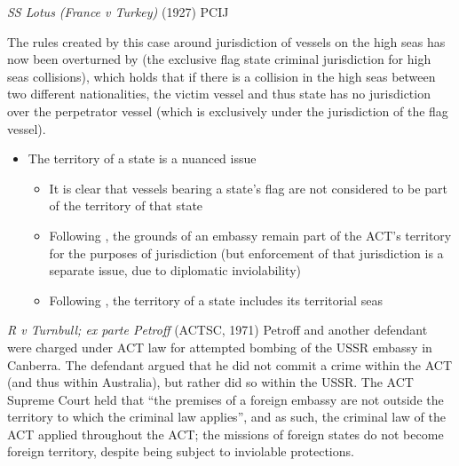 \begin{casedetails}{\textit{SS Lotus (France v Turkey)} (1927) PCIJ}
    \vspace{\baselineskip}

    The rules created by this case around jurisdiction of vessels on the high seas has now been overturned by  (the exclusive flag state criminal jurisdiction for high seas collisions), which holds that if there is a collision in the high seas between two different nationalities, the victim vessel and thus state has no jurisdiction over the perpetrator vessel (which is exclusively under the jurisdiction of the flag vessel).
\end{casedetails}

\begin{itemize}
    \item The territory of a state is a nuanced issue
    \begin{itemize}
        \item It is clear that vessels bearing a state's flag are not considered to be part of the territory of that state
        \item Following , the grounds of an embassy remain part of the ACT's territory for the purposes of jurisdiction (but enforcement of that jurisdiction is a separate issue, due to diplomatic inviolability)
        \item Following , the territory of a state includes its territorial seas
    \end{itemize}
\end{itemize}

\begin{casedetails}{\textit{R v Turnbull; ex parte Petroff} (ACTSC, 1971)}
    \flushleft
    Petroff and another defendant were charged under ACT law for attempted bombing of the USSR embassy in Canberra. The defendant argued that he did not commit a crime within the ACT (and thus within Australia), but rather did so within the USSR. The ACT Supreme Court held that ``the premises of a foreign embassy are not outside the territory to which the criminal law applies'', and as such, the criminal law of the ACT applied throughout the ACT; the missions of foreign states do not become foreign territory, despite being subject to inviolable protections.
\end{casedetails}

